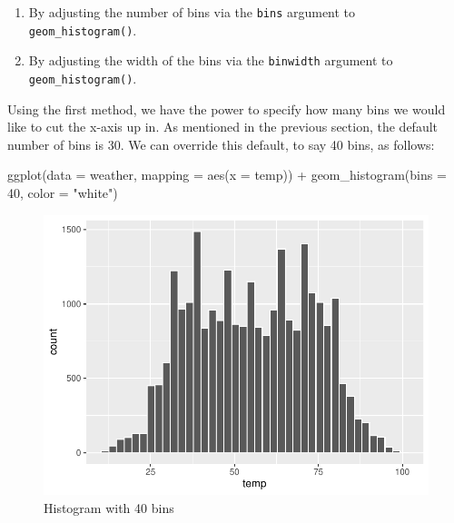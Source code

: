 \documentclass[
  letterpaper,
  DIV=11,
  numbers=noendperiod]{scrreprt}
\newenvironment{Shaded}{\begin{snugshade}}{\end{snugshade}}
\newcommand{\AttributeTok}[1]{\textcolor[rgb]{0.40,0.45,0.13}{#1}}
\newcommand{\DecValTok}[1]{\textcolor[rgb]{0.68,0.00,0.00}{#1}}
\newcommand{\FunctionTok}[1]{\textcolor[rgb]{0.28,0.35,0.67}{#1}}
\newcommand{\NormalTok}[1]{\textcolor[rgb]{0.00,0.23,0.31}{#1}}
\newcommand{\SpecialCharTok}[1]{\textcolor[rgb]{0.37,0.37,0.37}{#1}}
\newcommand{\StringTok}[1]{\textcolor[rgb]{0.13,0.47,0.30}{#1}}
\providecommand{\tightlist}{%
  \setlength{\itemsep}{0pt}\setlength{\parskip}{0pt}}\usepackage{longtable,booktabs,array}
\theoremstyle{definition}
\theoremstyle{remark}
\begin{document}
\begin{enumerate}
\def\labelenumi{\arabic{enumi}.}
\tightlist
\item
  By adjusting the number of bins via the \texttt{bins} argument to
  \texttt{geom\_histogram()}.
\item
  By adjusting the width of the bins via the \texttt{binwidth} argument
  to \texttt{geom\_histogram()}.
\end{enumerate}

Using the first method, we have the power to specify how many bins we
would like to cut the x-axis up in. As mentioned in the previous
section, the default number of bins is 30. We can override this default,
to say 40 bins, as follows:

\begin{Shaded}
\begin{Highlighting}[]
\FunctionTok{ggplot}\NormalTok{(}\AttributeTok{data =}\NormalTok{ weather, }\AttributeTok{mapping =} \FunctionTok{aes}\NormalTok{(}\AttributeTok{x =}\NormalTok{ temp)) }\SpecialCharTok{+}
  \FunctionTok{geom\_histogram}\NormalTok{(}\AttributeTok{bins =} \DecValTok{40}\NormalTok{, }\AttributeTok{color =} \StringTok{"white"}\NormalTok{)}
\end{Highlighting}
\end{Shaded}

\begin{figure}[H]

{\centering \includegraphics{02-visualization_files/figure-pdf/fig-hist-bins40-1.pdf}

}

\caption{\label{fig-hist-bins40}Histogram with 40 bins}

\end{figure}
\end{document}
